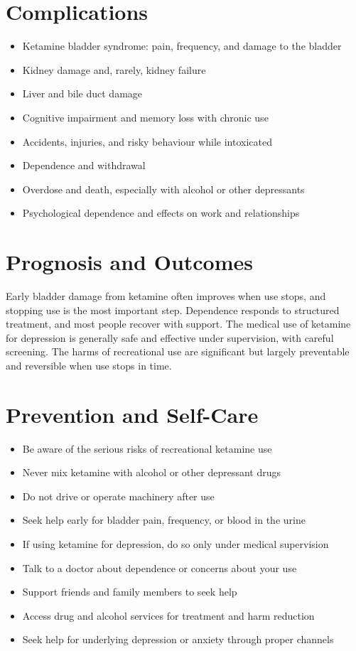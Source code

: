 \section*{Complications}
\begin{itemize}
    \item Ketamine bladder syndrome: pain, frequency, and damage to the bladder
    \item Kidney damage and, rarely, kidney failure
    \item Liver and bile duct damage
    \item Cognitive impairment and memory loss with chronic use
    \item Accidents, injuries, and risky behaviour while intoxicated
    \item Dependence and withdrawal
    \item Overdose and death, especially with alcohol or other depressants
    \item Psychological dependence and effects on work and relationships
\end{itemize}

\section*{Prognosis and Outcomes}
Early bladder damage from ketamine often improves when use stops, and stopping use is the most important step. Dependence responds to structured treatment, and most people recover with support. The medical use of ketamine for depression is generally safe and effective under supervision, with careful screening. The harms of recreational use are significant but largely preventable and reversible when use stops in time.

\section*{Prevention and Self-Care}
\begin{itemize}
    \item Be aware of the serious risks of recreational ketamine use
    \item Never mix ketamine with alcohol or other depressant drugs
    \item Do not drive or operate machinery after use
    \item Seek help early for bladder pain, frequency, or blood in the urine
    \item If using ketamine for depression, do so only under medical supervision
    \item Talk to a doctor about dependence or concerns about your use
    \item Support friends and family members to seek help
    \item Access drug and alcohol services for treatment and harm reduction
    \item Seek help for underlying depression or anxiety through proper channels
\end{itemize}

